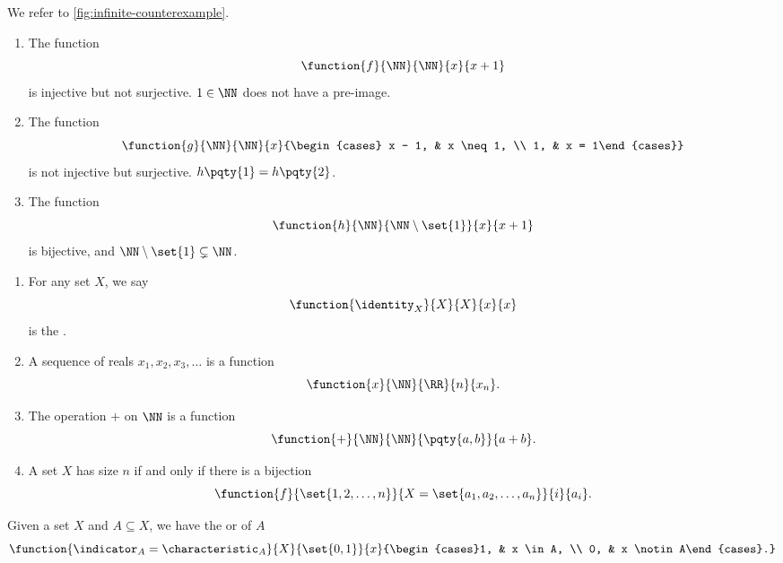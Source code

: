 \begin{examples}
    We refer to \autoref{fig:infinite-counterexample}.

    \begin{enumerate}
        \item The function
        \[
            \function{f}{\NN}{\NN}{x}{x + 1}
        \]
        is injective but not surjective. \(1 \in \NN\) does not have a pre-image.

        \item The function
        \[
            \function{g}{\NN}{\NN}{x}{\begin{cases}
            x - 1, & x \neq 1, \\ 1, & x = 1\end{cases}}
        \]
        is not injective but surjective. \(h\pqty{1} = h\pqty{2}\).

        \item The function
        \[
            \function{h}{\NN}{\NN \setminus \set{1}}{x}{x + 1}
        \]
        is bijective, and \(\NN \setminus \set{1} \subsetneq \NN\).
    \end{enumerate}
\end{examples}

\begin{examples}
    \begin{enumerate}
        \item For any set \(X\), we say
        \[
            \function{\identity_X}{X}{X}{x}{x}
        \]
        is the .

        \item A sequence of reals \(x_1, x_2, x_3, \ldots\) is a function
        \[
            \function{x}{\NN}{\RR}{n}{x_n}.
        \]
        
        \item The operation \(+\) on \(\NN\) is a function
        \[
            \function{+}{\NN}{\NN}{\pqty{a, b}}{a + b}.
        \]

        \item A set \(X\) has size \(n\) if and only if there is a bijection
        \[
            \function{f}{\set{1, 2, \ldots, n}}{X = \set{a_1, a_2, \ldots, a_n}}{i}{a_i}.
        \]
    \end{enumerate}
\end{examples}

\begin{definition}
    Given a set \(X\) and \(A \subseteq X\), we have the  or  of \(A\)
    \[
        \function{\indicator_A = \characteristic_A}{X}{\set{0, 1}}{x}{\begin{cases}1, & x \in A, \\ 0, & x \notin A\end{cases}.}
    \]
\end{definition}

